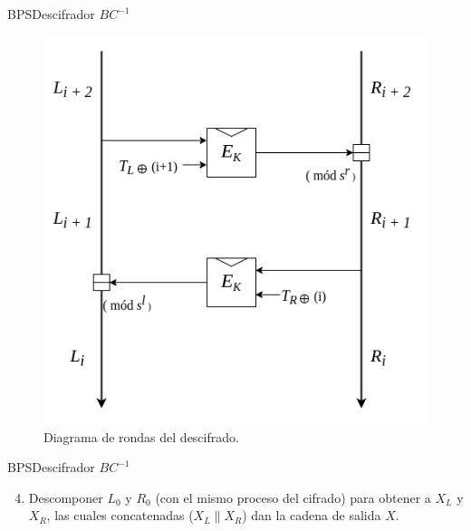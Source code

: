\begin{frame}{BPS}{Descifrador $BC^{-1}$}

  \begin{figure}[H]
    \begin{center}
      \includegraphics[width=0.6\linewidth]
      {../../../diagramas_comunes/bps/descifrado_bc}
      \caption{Diagrama de rondas del descifrado.}
     \end{center}
  \end{figure}
    
\end{frame}

\begin{frame}{BPS}{Descifrador $BC^{-1}$}

  \begin{enumerate}
    \setcounter{enumi}{3}
    \item Descomponer $L_0$ y $R_0$ (con el mismo proceso del cifrado) para 
      obtener a $X_L$ y $X_R$, las cuales concatenadas ($X_L \parallel X_R$) 
      dan la cadena de salida $X$.
  \end{enumerate}
  
\end{frame}

